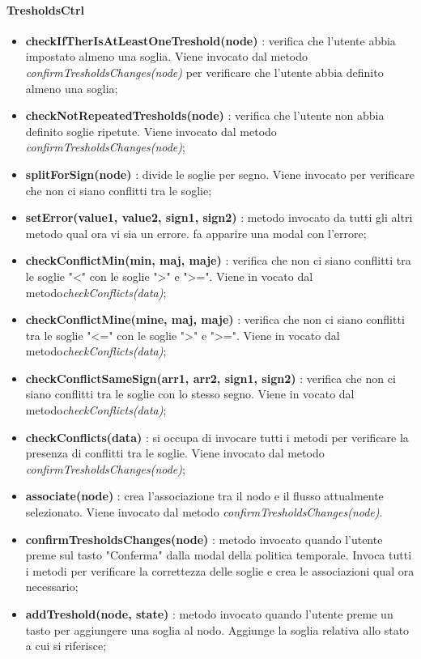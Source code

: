 				  \paragraph{TresholdsCtrl}
			\begin{itemize}
				\item \textbf{checkIfTherIsAtLeastOneTreshold(node)} : verifica che l'utente abbia impostato almeno una soglia. Viene invocato dal metodo \textit{confirmTresholdsChanges(node)} per verificare che l'utente abbia definito almeno una soglia;
				\item \textbf{checkNotRepeatedTresholds(node)} : verifica che l'utente non abbia definito soglie ripetute. Viene invocato dal metodo \textit{confirmTresholdsChanges(node)};
				\item \textbf{splitForSign(node)} : divide le soglie per segno. Viene invocato per verificare che non ci siano conflitti tra le soglie;
				\item \textbf{setError(value1, value2, sign1, sign2)} : metodo invocato da tutti gli altri metodo qual ora vi sia un errore. fa apparire una modal con l'errore;
				\item \textbf{checkConflictMin(min, maj, maje)} : verifica che non ci siano conflitti tra le soglie "<" con le soglie ">" e ">=". Viene in vocato dal metodo\textit{checkConflicts(data)};
				\item \textbf{checkConflictMine(mine, maj, maje)} : verifica che non ci siano conflitti tra le soglie "<=" con le soglie ">" e ">=". Viene in vocato dal metodo\textit{checkConflicts(data)};
				\item \textbf{checkConflictSameSign(arr1, arr2, sign1, sign2)} : verifica che non ci siano conflitti tra le soglie con lo stesso segno. Viene in vocato dal metodo\textit{checkConflicts(data)};
				\item \textbf{checkConflicts(data)} : si occupa di invocare tutti i metodi per verificare la presenza di conflitti tra le soglie. Viene invocato dal metodo \textit{confirmTresholdsChanges(node)};
				\item \textbf{associate(node)} : crea l'associazione tra il nodo e il flusso attualmente selezionato. Viene invocato dal metodo \textit{confirmTresholdsChanges(node)}.
				\item \textbf{confirmTresholdsChanges(node)} : metodo invocato quando l'utente preme sul tasto "Conferma" dalla modal della politica temporale. Invoca tutti i metodi per verificare la correttezza delle soglie e crea le associazioni qual ora necessario;
				\item \textbf{addTreshold(node, state)} : metodo invocato quando l'utente preme un tasto per aggiungere una soglia al nodo. Aggiunge la soglia relativa allo stato a cui si riferisce;

\end{itemize}
